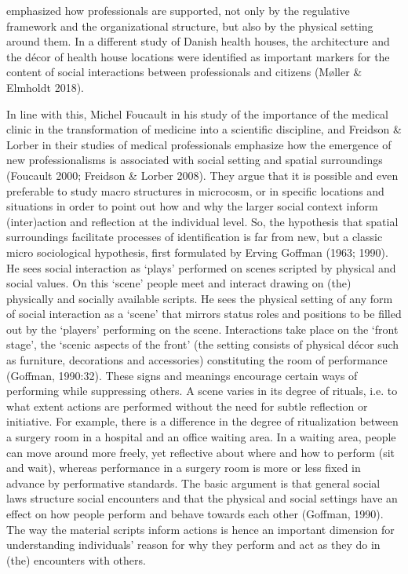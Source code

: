 emphasized how professionals are supported, not only by the regulative framework and the organizational structure, but also by the physical setting around them. In a different study of Danish health houses, the architecture and the décor of health house locations were identified as important markers for the content of social interactions between professionals and citizens (Møller \& Elmholdt 2018). \par
In line with this, Michel Foucault in his study of the importance of the medical clinic in the transformation of medicine into a scientific discipline, and Freidson \& Lorber in their studies of medical professionals emphasize how the emergence of new professionalisms is associated with social setting and spatial surroundings (Foucault 2000; Freidson \& Lorber 2008). They argue that it is possible and even preferable to study macro structures in microcosm, or in specific locations and situations in order to point out how and why the larger social context inform (inter)action and reflection at the individual level. So, the hypothesis that spatial surroundings facilitate processes of identification is far from new, but a classic micro sociological hypothesis, first formulated by Erving Goffman (1963; 1990). He sees social interaction as ‘plays’ performed on scenes scripted by physical and social values. On this ‘scene’ people meet and interact drawing on (the) physically and socially available scripts. He sees the physical setting of any form of social interaction as a ‘scene’ that mirrors status roles and positions to be filled out by the ‘players’ performing on the scene. Interactions take place on the ‘front stage’, the ‘scenic aspects of the front’ (the setting consists of physical décor such as furniture, decorations and accessories) constituting the room of performance (Goffman, 1990:32). These signs and meanings encourage certain ways of performing while suppressing others. A scene varies in its degree of rituals, i.e. to what extent actions are performed without the need for subtle reflection or initiative. For example, there is a difference in the degree of ritualization between a surgery room in a hospital and an office waiting area. In a waiting area, people can move around more freely, yet reflective about where and how to perform (sit and wait), whereas performance in a surgery room is more or less fixed in advance by performative standards. The basic argument is that general social laws structure social encounters and that the physical and social settings have an effect on how people perform and behave towards each other (Goffman, 1990). The way the material scripts inform actions is hence an important dimension for understanding individuals’ reason for why they perform and act as they do in (the) encounters with others. 

